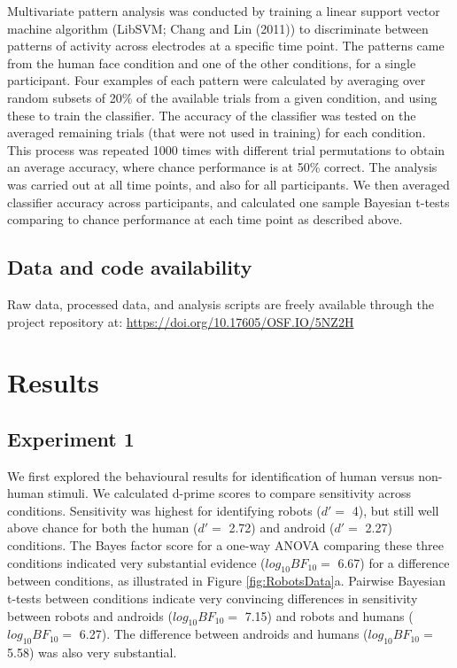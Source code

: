 \documentclass[
]{article}
\begin{document}
Multivariate pattern analysis was conducted by training a linear support vector machine algorithm (LibSVM; Chang and Lin (2011)) to discriminate between patterns of activity across electrodes at a specific time point. The patterns came from the human face condition and one of the other conditions, for a single participant. Four examples of each pattern were calculated by averaging over random subsets of 20\% of the available trials from a given condition, and using these to train the classifier. The accuracy of the classifier was tested on the averaged remaining trials (that were not used in training) for each condition. This process was repeated 1000 times with different trial permutations to obtain an average accuracy, where chance performance is at 50\% correct. The analysis was carried out at all time points, and also for all participants. We then averaged classifier accuracy across participants, and calculated one sample Bayesian t-tests comparing to chance performance at each time point as described above.

\hypertarget{data-and-code-availability}{%
\subsection{Data and code availability}\label{data-and-code-availability}}

Raw data, processed data, and analysis scripts are freely available through the project repository at: \url{https://doi.org/10.17605/OSF.IO/5NZ2H}

\hypertarget{results}{%
\section{Results}\label{results}}

\hypertarget{experiment-1}{%
\subsection{Experiment 1}\label{experiment-1}}

We first explored the behavioural results for identification of human versus non-human stimuli. We calculated d-prime scores to compare sensitivity across conditions. Sensitivity was highest for identifying robots (\(d' =\) 4), but still well above chance for both the human (\(d' =\) 2.72) and android (\(d' =\) 2.27) conditions. The Bayes factor score for a one-way ANOVA comparing these three conditions indicated very substantial evidence (\(log_{10}BF_{10} =\) 6.67) for a difference between conditions, as illustrated in Figure \ref{fig:RobotsData}a. Pairwise Bayesian t-tests between conditions indicate very convincing differences in sensitivity between robots and androids (\(log_{10}BF_{10} =\) 7.15) and robots and humans (\(log_{10}BF_{10} =\) 6.27). The difference between androids and humans (\(log_{10}BF_{10} =\) 5.58) was also very substantial.
\end{document}
